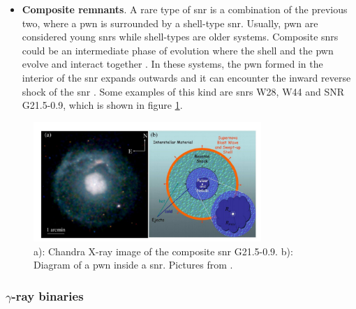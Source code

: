 \documentclass[main.tex]{subfiles}
\begin{document}
\begin{itemize}
    \item \textbf{Composite remnants}. A rare type of \gls{snr} is a combination of the previous two, where a \gls{pwn} is surrounded by a shell-type \gls{snr}. Usually, \gls{pwn} are considered young \glspl{snr} while shell-types are older systems. Composite \glspl{snr} could be an intermediate phase of evolution where the shell and the \gls{pwn} evolve and interact together \cite{2014compositeSNRhess}. In these systems, the \gls{pwn} formed in the interior of the \gls{snr} expands outwards and it can encounter the inward reverse shock of the \gls{snr} \cite{2015SNRingammarays}. Some examples of this kind are \glspl{snr} W28, W44 and SNR G21.5-0.9, which is shown in figure \ref{fig:compositesnr}. \\
\end{itemize} 

\begin{figure}
\centering
 \includegraphics[width=0.77\textwidth]{Pictures/compositesnr.pdf}
  \caption{a): Chandra X-ray image of the composite \gls{snr} G21.5-0.9. b): Diagram of a \gls{pwn} inside a \gls{snr}. Pictures from \cite{2015SNRingammarays}.}
    \label{fig:compositesnr}
\end{figure}


\subsubsection{$\gamma$-ray binaries}
\end{document}
